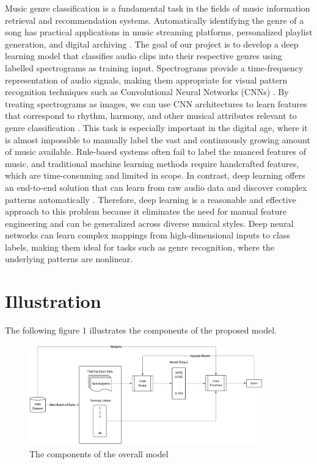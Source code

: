\documentclass{article} %
\begin{document}
Music genre classification is a fundamental task in the fields of music information retrieval and recommendation systems. Automatically identifying the genre of a song has practical applications in music streaming platforms, personalized playlist generation, and digital archiving \citep{spotify_ai_dj}. The goal of our project is to develop a deep learning model that classifies audio clips into their respective genres using labelled spectrograms as training input. Spectrograms provide a time-frequency representation of audio signals, making them appropriate for visual pattern recognition techniques such as Convolutional Neural Networks (CNNs) \citep{doshi_mel_spectrogram}. By treating spectrograms as images, we can use CNN architectures to learn features that correspond to rhythm, harmony, and other musical attributes relevant to genre classification \citep{wikipedia_spectrogram}. This task is especially important in the digital age, where it is almost impossible to manually label the vast and continuously growing amount of music available. Rule-based systems often fail to label the nuanced features of music, and traditional machine learning methods require handcrafted features, which are time-consuming and limited in scope. In contrast, deep learning offers an end-to-end solution that can learn from raw audio data and discover complex patterns automatically \citep{stihec_ai_weapon}. Therefore, deep learning is a reasonable and effective approach to this problem because it eliminates the need for manual feature engineering and can be generalized across diverse musical styles. Deep neural networks can learn complex mappings from high-dimensional inputs to class labels, making them ideal for tasks such as genre recognition, where the underlying patterns are nonlinear.


\section{Illustration}

The following figure 1 illustrates the components of the proposed model.

\begin{figure}[htbp]
  \centering
  \includegraphics[width=0.9\textwidth]{model.jpeg}
  \caption{The components of the overall model}
  \label{fig:model_components}
\end{figure}
\end{document}
